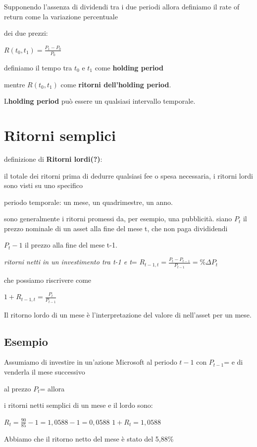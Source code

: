 \documentclass[a4paper,11pt]{report}
\begin{document}
{	Supponendo l'assenza di dividendi tra i due periodi allora definiamo il rate of return come la variazione percentuale

	dei due prezzi:
\begin{center}
	$R(t_0,t_1)={\frac {P_1-P_0}{P_0}}$
\end{center}
	definiamo il tempo tra $t_0$ e $t_1$ come \textbf{holding period}  

	mentre $R(t_0,t_1)$ come \textbf{ritorni dell'holding period}.

	L\textbf{holding period} può essere un qualsiasi intervallo temporale.

\section{Ritorni semplici}
	definizione di \textbf{Ritorni lordi(?)}:

	il totale dei ritorni prima di dedurre qualsiasi fee o spesa necessaria, i ritorni lordi sono visti su uno specifico

	periodo temporale: un mese, un quadrimestre, un anno. 

	sono generalmente i ritorni promessi da, per esempio, una pubblicità. \newline
 	siano $P_t$ il prezzo nominale di un asset alla fine del mese t, che non paga divididendi

	$P_t-1$ il prezzo alla fine del mese t-1. \newline

\begin{center}
	{\emph{ritorni netti in un investimento tra t-1 e t}}= $R_{t-1,t}={\frac {P_t - P_{t-1}}{P_{t-1}}}= \%\Delta P_t$
\end{center}	
	che possiamo riscrivere come
\begin{center}
 	$1+R_{t-1,t}={\frac {P_t}{P_{t-1}}}$
\end{center}
	Il ritorno lordo di un mese è l'interpretazione del valore di {} nell'asset per un mese.
\subsection{Esempio}
	Assumiamo di investire in un'azione Microsoft al periodo $t-1$ con $P_{t-1}$={} e di venderla il mese successivo

	al prezzo $P_t$={} allora
	
	i ritorni netti semplici di un mese e il lordo sono:
\begin{center}
	$R_t={\frac{90}{85}}-1 = 1,0588-1= 0,0588$ \newline
	$1+R_t = 1,0588$
\end{center}
	Abbiamo che il ritorno netto del mese è stato del 5,88\%

}
\end{document}
